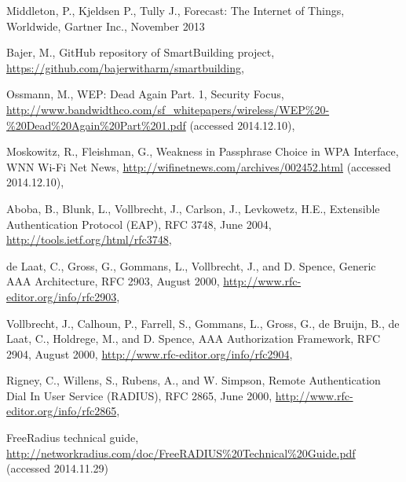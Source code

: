 \documentclass{llncs}
\begin{document}
%
%
\begin{thebibliography}{}
%
Middleton, P., Kjeldsen P., Tully J., Forecast: The Internet of Things,
Worldwide, Gartner Inc., November 2013

Bajer, M., GitHub repository of SmartBuilding project, 
\url{https://github.com/bajerwitharm/smartbuilding},

Ossmann, M., WEP: Dead Again Part. 1, Security Focus, 
\url{http://www.bandwidthco.com/sf_whitepapers/wireless/WEP%20-%20Dead%20Again%20Part%201.pdf}
(accessed 2014.12.10),

Moskowitz, R., Fleishman, G., Weakness in Passphrase Choice in WPA Interface,
WNN Wi-Fi Net News, 
\url{http://wifinetnews.com/archives/002452.html} (accessed 2014.12.10),

Aboba, B., Blunk, L., Vollbrecht, J., Carlson, J., Levkowetz, H.E., Extensible Authentication Protocol (EAP), RFC 3748, June 2004,
\url{http://tools.ietf.org/html/rfc3748},

de Laat, C., Gross, G., Gommans, L., Vollbrecht, J., and D. Spence, Generic AAA
Architecture, RFC 2903, August 2000,
\url{http://www.rfc-editor.org/info/rfc2903},

Vollbrecht, J., Calhoun, P., Farrell, S., Gommans, L., Gross, G., de Bruijn, B.,
de Laat, C., Holdrege, M., and D. Spence, AAA Authorization Framework, RFC
2904, August 2000, \url{http://www.rfc-editor.org/info/rfc2904},

Rigney, C., Willens, S., Rubens, A., and W. Simpson, Remote  Authentication
Dial In User Service (RADIUS), RFC 2865, June 2000,
\url{http://www.rfc-editor.org/info/rfc2865},

FreeRadius technical guide,
\url{http://networkradius.com/doc/FreeRADIUS%20Technical%20Guide.pdf} (accessed 2014.11.29)

\end{thebibliography}
\end{document}

